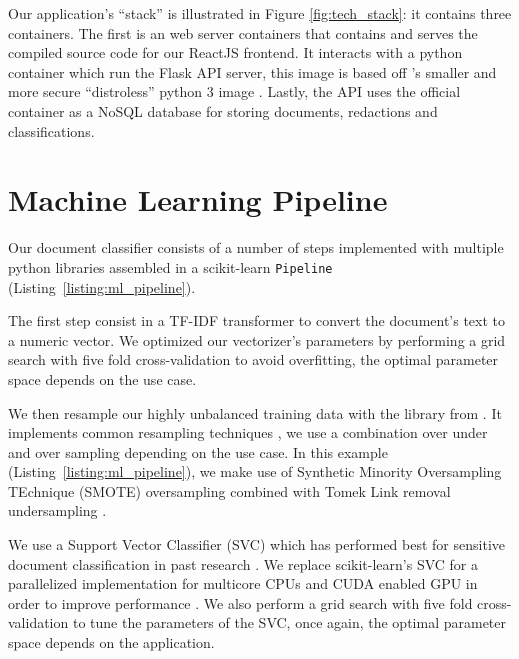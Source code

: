 \documentclass[\version]{l4proj}
\begin{document}

Our application's ``stack'' is illustrated in Figure \ref{fig:tech_stack}: it contains three containers.
The first is an \textcite{NGINX2020} web server containers that contains and serves the compiled source code for our ReactJS frontend.
It interacts with a python container which run the Flask API server, this image is based off \textcite{GoogleContainerToolsDistroless2020}'s smaller and more secure ``distroless'' python 3 image \autocite{mooreDistrolessDockerContainerizing2017}.
Lastly, the API uses the official \textcite{MongoDB2020} container as a NoSQL database for storing documents, redactions and classifications.

\section{Machine Learning Pipeline}

Our document classifier consists of a number of steps implemented with multiple python libraries assembled in a scikit-learn \verb|Pipeline| (Listing~\ref{listing:ml_pipeline}).

The first step consist in a TF-IDF transformer to convert the document's text to a numeric vector.
We optimized our vectorizer's parameters by performing a grid search with five fold cross-validation to avoid overfitting, the optimal parameter space depends on the use case.

We then resample our highly unbalanced training data with the \textcite{ScikitlearncontribImbalancedlearn2020} library from \textcite{lemaitreImbalancedlearnPythonToolbox2017}.
It implements common resampling techniques \autocite{lemaitreImbalancedlearnPythonToolbox2017}, we use a combination over under and over sampling depending on the use case.
In this example (Listing~\ref{listing:ml_pipeline}), we make use of Synthetic Minority Oversampling TEchnique (SMOTE) oversampling combined with Tomek Link removal undersampling \autocite{batistaStudyBehaviorSeveral2004}.

We use a Support Vector Classifier (SVC) which has performed best for sensitive document classification in past research \autocite{mcdonaldClassifierDigitalSensitivity2014,mcdonaldStudySVMKernel2017}.
We replace scikit-learn's SVC for a parallelized implementation for multicore CPUs and CUDA enabled GPU in order to improve performance \autocite{wenThunderSVMFastSVM2018}.
We also perform a grid search with five fold cross-validation to tune the parameters of the SVC, once again, the optimal parameter space depends on the application.
\end{document}
